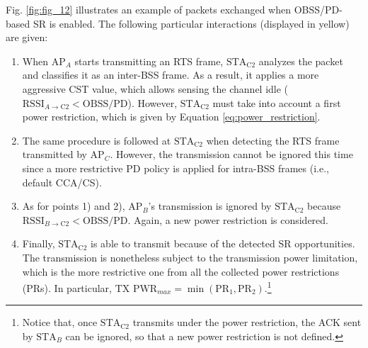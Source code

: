 \documentclass[comsoc]{IEEEtran}
\begin{document}
	Fig. \ref{fig:fig_12} illustrates an example of packets exchanged when OBSS/PD-based SR is enabled. The following particular interactions (displayed in yellow) are given:
	\begin{enumerate}
		\item When $\text{AP}_A$ starts transmitting an RTS frame, $\text{STA}_\text{C2}$ analyzes the packet and classifies it as an inter-BSS frame. As a result, it applies a more aggressive CST value, which allows sensing the channel idle ($\text{RSSI}_{A \rightarrow \text{C2}} < \text{OBSS/PD}$). However, $\text{STA}_\text{C2}$ must take into account a first power restriction, which is given by Equation \eqref{eq:power_restriction}.
		\item The same procedure is followed at $\text{STA}_\text{C2}$ when detecting the RTS frame transmitted by $\text{AP}_C$. However, the transmission cannot be ignored this time since a more restrictive PD policy is applied for intra-BSS frames (i.e., default CCA/CS).
		\item As for points 1) and 2), $\text{AP}_B$'s transmission is ignored by $\text{STA}_\text{C2}$ because $\text{RSSI}_{B \rightarrow \text{C2}} < \text{OBSS/PD}$. Again, a new power restriction is considered.
		\item Finally, $\text{STA}_\text{C2}$ is able to transmit because of the detected SR opportunities. The transmission is nonetheless subject to the transmission power limitation, which is the more restrictive one from all the collected power restrictions (PRs). In particular, $\text{TX PWR}_{max} = \min(\text{PR}_1, \text{PR}_2)$.\footnote{Notice that, once $\text{STA}_\text{C2}$ transmits under the power restriction, the ACK sent by $\text{STA}_B$ can be ignored, so that a new power restriction is not defined.}
	\end{enumerate}
	
\end{document}
